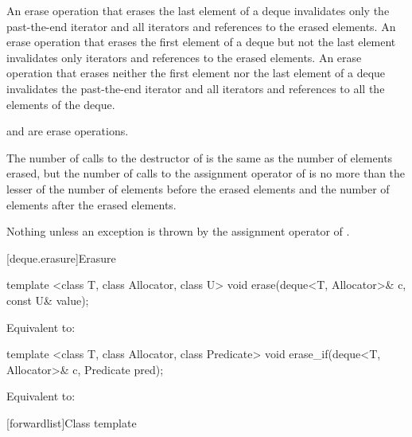 \begin{itemdescr}
\pnum
\effects
An erase operation that erases the last element of a deque invalidates only the past-the-end iterator
and all iterators and references to the erased elements. An erase operation that erases the first
element of a deque but not the last element invalidates only iterators
and references to the erased elements. An erase operation
that erases neither the first element nor the last element of a deque invalidates the past-the-end
iterator and all iterators and references to all the elements of the deque.
\begin{note}  and  are erase operations. \end{note}

\pnum
\complexity
The number of calls to the destructor of  is the same as the
number of elements erased, but the number of calls to the assignment operator of  is
no more than the lesser of the number of elements before the erased elements and the number of elements after the erased elements.

\pnum
\throws
Nothing unless an exception is thrown by the assignment operator of
.
\end{itemdescr}

[deque.erasure]{Erasure}

%
\begin{itemdecl}
template <class T, class Allocator, class U>
  void erase(deque<T, Allocator>& c, const U& value);
\end{itemdecl}

\begin{itemdescr}
\pnum
\effects
Equivalent to: 
\end{itemdescr}

%
\begin{itemdecl}
template <class T, class Allocator, class Predicate>
  void erase_if(deque<T, Allocator>& c, Predicate pred);
\end{itemdecl}

\begin{itemdescr}
\pnum
\effects
Equivalent to: 
\end{itemdescr}

[forwardlist]{Class template }

